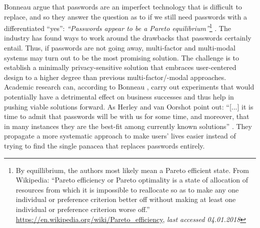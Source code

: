 Bonneau \etal argue that passwords are an imperfect technology that is difficult to replace, and so they answer the question as to if we still need passwords with a differentiated ``yes'': \textit{``Passwords appear to be a Pareto equilibrium''}\footnote{By equillibrium, the authors most likely mean a Pareto efficient state. From Wikipedia: ``Pareto efficiency or Pareto optimality is a state of allocation of resources from which it is impossible to reallocate so as to make any one individual or preference criterion better off without making at least one individual or preference criterion worse off.'' \url{https://en.wikipedia.org/wiki/Pareto_efficiency}, \textit{last accessed 04.01.2018}} \cite{Bonneau2015ImperfectAuthentication}. The industry has found ways to work around the drawbacks that passwords certainly entail. Thus, if passwords are not going away, multi-factor and multi-modal systems may turn out to be the most promising solution. The challenge is to establish a minimally privacy-sensitive solution that embraces user-centered design to a higher degree than previous multi-factor/-modal approaches. Academic research can, according to Bonneau \etal, carry out experiments that would potentially have a detrimental effect on business successes and thus help in pushing viable solutions forward. As Herley and van Oorshot point out: ``[...] it is time to admit that passwords will be with us for some time, and moreover, that in many instances they are the best-fit among currently known solutions'' \cite{Herley2012PersistenceOfPasswords}. They propagate a more systematic approach to make users' lives easier instead of trying to find the single panacea that replaces passwords entirely.


 	
 
